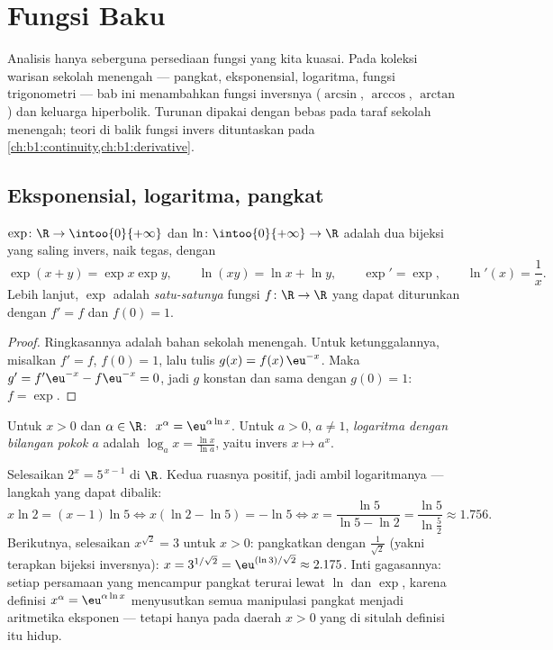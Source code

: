 \chapter{Fungsi Baku}\label{ch:b1:functions}

Analisis hanya seberguna persediaan fungsi yang kita kuasai. Pada
koleksi warisan sekolah menengah --- pangkat, eksponensial,
logaritma, fungsi trigonometri --- bab ini menambahkan fungsi
inversnya ($\arcsin$, $\arccos$, $\arctan$) dan keluarga hiperbolik.
Turunan dipakai dengan bebas pada taraf sekolah menengah; teori
di balik fungsi invers dituntaskan pada
\cref{ch:b1:continuity,ch:b1:derivative}.

\section{Eksponensial, logaritma, pangkat}

\begin{proposition}\label{prop:b1:functions:expln}
$\exp \colon \R \to \intoo{0}{+\infty}$ dan $\ln \colon
\intoo{0}{+\infty} \to \R$ adalah dua bijeksi yang saling invers, naik
tegas, dengan
\[
\exp(x + y) = \exp x \exp y, \qquad \ln(xy) = \ln x + \ln y,
\qquad \exp' = \exp, \qquad \ln'(x) = \frac 1x .
\]
Lebih lanjut, $\exp$ adalah \emph{satu-satunya} fungsi $f \colon
\R \to \R$ yang dapat diturunkan dengan $f' = f$ dan $f(0) = 1$.
\end{proposition}

\begin{proof}
Ringkasannya adalah bahan sekolah menengah. Untuk ketunggalannya, misalkan $f' = f$,
$f(0) = 1$, lalu tulis $g(x) = f(x)\,\eu^{-x}$. Maka $g' = f'\eu^{-x} -
f\eu^{-x} = 0$, jadi $g$ konstan dan sama dengan $g(0) = 1$: $f = \exp$.
\end{proof}

\begin{definition}\label{def:b1:functions:powers}
Untuk $x > 0$ dan $\alpha \in \R$:
$\;x^\alpha = \eu^{\alpha \ln x}$. Untuk $a > 0$,
$a \neq 1$, \emph{logaritma dengan bilangan pokok $a$} adalah $\log_a x =
\frac{\ln x}{\ln a}$, yaitu invers $x \mapsto a^x$.
\end{definition}

\begin{example}\label{ex:b1:functions:expequations}
Selesaikan $2^x = 5^{\,x-1}$ di $\R$. Kedua ruasnya positif, jadi ambil
logaritmanya --- langkah yang dapat dibalik:
\[
x\ln2 = (x - 1)\ln5
\iff x(\ln2 - \ln5) = -\ln5
\iff x = \frac{\ln5}{\ln5 - \ln2} = \frac{\ln 5}{\ln\frac52}
\approx 1.756 .
\]
Berikutnya, selesaikan $x^{\sqrt2} = 3$ untuk $x > 0$: pangkatkan dengan
$\frac1{\sqrt2}$ (yakni terapkan bijeksi inversnya):
$x = 3^{1/\sqrt2} = \eu^{(\ln 3)/\sqrt2} \approx 2.175$. Inti
gagasannya: setiap persamaan yang mencampur pangkat terurai lewat $\ln$ dan
$\exp$, karena definisi $x^\alpha = \eu^{\alpha\ln x}$
menyusutkan semua manipulasi pangkat menjadi aritmetika eksponen ---
tetapi hanya pada daerah $x > 0$ yang di situlah definisi itu hidup.
\end{example}

